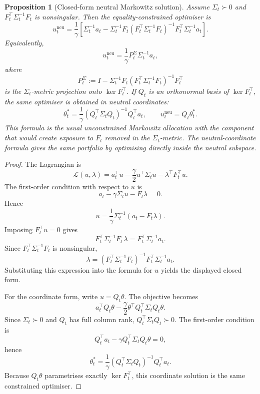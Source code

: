\documentclass[11pt]{article}
\newtheorem{proposition}{Proposition}
\begin{document}
\begin{proposition}[Closed-form neutral Markowitz solution]
\label{prop:kkt-neutral-solution}
Assume $\Sigma_t\succ0$ and $F_t^\top\Sigma_t^{-1}F_t$ is nonsingular.  Then the
equality-constrained optimiser is
\begin{equation}
        u_t^{\mathrm{neu}}
        =
        \frac{1}{\gamma}
        \left[
        \Sigma_t^{-1}a_t
        -
        \Sigma_t^{-1}F_t
        (F_t^\top\Sigma_t^{-1}F_t)^{-1}
        F_t^\top\Sigma_t^{-1}a_t
        \right].
\end{equation}
Equivalently,
\begin{equation}
        u_t^{\mathrm{neu}}=\frac{1}{\gamma}P_t^\Sigma \Sigma_t^{-1}a_t,
\end{equation}
where
\begin{equation}
        P_t^\Sigma:=I-\Sigma_t^{-1}F_t(F_t^\top\Sigma_t^{-1}F_t)^{-1}F_t^\top
\end{equation}
is the $\Sigma_t$-metric projection onto $\ker F_t^\top$.  If $Q_t$ is an orthonormal basis of
$\ker F_t^\top$, the same optimiser is obtained in neutral coordinates:
\begin{equation}
        \theta_t^\ast=\frac{1}{\gamma}(Q_t^\top\Sigma_tQ_t)^{-1}Q_t^\top a_t,
        \qquad u_t^{\mathrm{neu}}=Q_t\theta_t^\ast.
\end{equation}
This formula is the usual unconstrained Markowitz allocation with the component that would create
exposure to $F_t$ removed in the $\Sigma_t$-metric.  The neutral-coordinate formula gives the same
portfolio by optimising directly inside the neutral subspace.
\end{proposition}

\begin{proof}
The Lagrangian is
\[
        \mathcal L(u,\lambda)=a_t^\top u-\frac{\gamma}{2}u^\top\Sigma_tu-\lambda^\top F_t^\top u.
\]
The first-order condition with respect to $u$ is
\[
        a_t-\gamma\Sigma_tu-F_t\lambda=0.
\]
Hence
\[
        u=\frac{1}{\gamma}\Sigma_t^{-1}(a_t-F_t\lambda).
\]
Imposing $F_t^\top u=0$ gives
\[
        F_t^\top\Sigma_t^{-1}F_t\,\lambda=F_t^\top\Sigma_t^{-1}a_t.
\]
Since $F_t^\top\Sigma_t^{-1}F_t$ is nonsingular,
\[
        \lambda=(F_t^\top\Sigma_t^{-1}F_t)^{-1}F_t^\top\Sigma_t^{-1}a_t.
\]
Substituting this expression into the formula for $u$ yields the displayed closed form.

For the coordinate form, write $u=Q_t\theta$.  The objective becomes
\[
        a_t^\top Q_t\theta-\frac{\gamma}{2}\theta^\top Q_t^\top\Sigma_tQ_t\theta.
\]
Since $\Sigma_t\succ0$ and $Q_t$ has full column rank, $Q_t^\top\Sigma_tQ_t\succ0$.  The first-order
condition is
\[
        Q_t^\top a_t-\gamma Q_t^\top\Sigma_tQ_t\theta=0,
\]
hence
\[
        \theta_t^\ast=\frac{1}{\gamma}(Q_t^\top\Sigma_tQ_t)^{-1}Q_t^\top a_t.
\]
Because $Q_t\theta$ parametrises exactly $\ker F_t^\top$, this coordinate solution is the same
constrained optimiser.
\end{proof}
\end{document}

